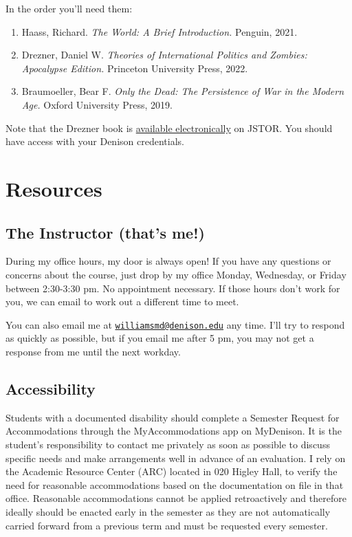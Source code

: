 \documentclass[11pt,]{article}
\begin{document}
In the order you'll need them:

\begin{enumerate}
\def\labelenumi{\arabic{enumi}.}
\item
  Haass, Richard. \emph{The World: A Brief Introduction.} Penguin, 2021.
\item
  Drezner, Daniel W. \emph{Theories of International Politics and
  Zombies: Apocalypse Edition.} Princeton University Press, 2022.
\item
  Braumoeller, Bear F. \emph{Only the Dead: The Persistence of War in
  the Modern Age.} Oxford University Press, 2019.
\end{enumerate}

Note that the Drezner book is
\href{https://www.jstor.org/stable/j.ctv244sssd}{available
electronically} on JSTOR. You should have access with your Denison
credentials.

\hypertarget{resources}{%
\section{Resources}\label{resources}}

\hypertarget{the-instructor-thats-me}{%
\subsection{The Instructor (that's me!)}\label{the-instructor-thats-me}}

During my office hours, my door is always open! If you have any
questions or concerns about the course, just drop by my office Monday,
Wednesday, or Friday between 2:30-3:30 pm. No appointment necessary. If
those hours don't work for you, we can email to work out a different
time to meet.

You can also email me at
\href{mailto:williamsmd@denison.edu}{\nolinkurl{williamsmd@denison.edu}}
any time. I'll try to respond as quickly as possible, but if you email
me after 5 pm, you may not get a response from me until the next
workday.

\hypertarget{accessibility}{%
\subsection{Accessibility}\label{accessibility}}

Students with a documented disability should complete a Semester Request
for Accommodations through the MyAccommodations app on MyDenison. It is
the student's responsibility to contact me privately as soon as possible
to discuss specific needs and make arrangements well in advance of an
evaluation. I rely on the Academic Resource Center (ARC) located in 020
Higley Hall, to verify the need for reasonable accommodations based on
the documentation on file in that office. Reasonable accommodations
cannot be applied retroactively and therefore ideally should be enacted
early in the semester as they are not automatically carried forward from
a previous term and must be requested every semester.
\end{document}
